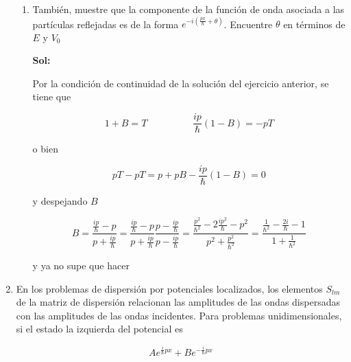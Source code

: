 \documentclass[12pt,a4paper]{article}
\begin{document}
\begin{enumerate}
\begin{enumerate}
        
        
        \item También, muestre que la componente de la función de onda asociada a las partículas reflejadas es de la forma $e^{-i \left(\frac{px}{\hbar} + \theta\right)}$. Encuentre $\theta$ en términos de $E$ y $V_0$
        
        \textbf{Sol:}
        
        Por la condición de continuidad de la solución del ejercicio anterior, se tiene que
        
        \begin{equation*}
            1+B = T \hspace{2cm} \frac{ip}{\hbar}(1-B) = -p T
        \end{equation*}
        
        o bien
        
        \begin{equation*}
            pT - pT = p +p B - \frac{ip}{\hbar} (1-B) = 0
        \end{equation*}
        
        y despejando $B$
        
        \begin{equation*}
            B = \frac{\frac{ip}{\hbar} - p}{p + \frac{ip}{\hbar}} = \frac{\frac{ip}{\hbar} - p}{p + \frac{ip}{\hbar}} \frac{p - \frac{ip}{\hbar}}{p - \frac{ip}{\hbar}} = \frac{\frac{p^2}{\hbar^2} - 2\frac{ip^2}{\hbar}- p^2}{p^2 +\frac{p^2}{\hbar^2}} = \frac{\frac{1}{\hbar^2}-\frac{2i}{\hbar}-1}{1 + \frac{1}{\hbar^2}}
        \end{equation*}
        
        y ya no supe que hacer
        
    \end{enumerate}
    
    
    
    
    
    
    \item En los problemas de dispersión por potenciales localizados, los elementos $S_{lm}$ de la matriz de dispersión relacionan las amplitudes de las ondas dispersadas con las amplitudes de las ondas incidentes. Para problemas unidimensionales, si el estado  la izquierda del potencial es
    
    \begin{equation*}
        Ae^{\frac{i}{\hbar}px} + B e^{-\frac{i}{\hbar}px}
    \end{equation*}
    

\end{enumerate}
\end{document}
